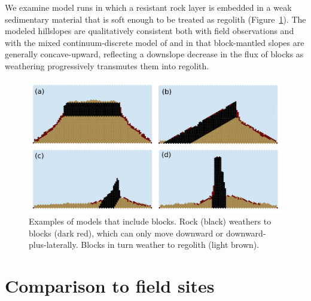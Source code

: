 \documentclass[esurf, manuscript]{copernicus}
\begin{document}
We examine model runs in which a resistant rock layer is embedded in a weak sedimentary material that is soft enough to be treated as regolith (Figure~\ref{blocks}). The modeled hillslopes are qualitatively consistent both with field observations and with the mixed continuum-discrete model of \citet{glade2017block} and \citet{glade2017quasi} in that block-mantled slopes are generally concave-upward, reflecting a downslope decrease in the flux of blocks as weathering progressively transmutes them into regolith.

 
\begin{figure}[t]
\includegraphics{Figures/block_runs.pdf}
\caption{Examples of models that include blocks. Rock (black) weathers to blocks (dark red), which can only move downward or downward-plus-laterally. Blocks in turn weather to regolith (light brown).}
\label{blocks}
\end{figure}


\section{Comparison to field sites}
\end{document}
